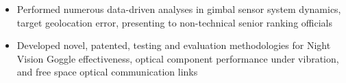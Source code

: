 \begin{itemize} [leftmargin = \itemmargin]
	\item Performed numerous data-driven analyses in gimbal sensor system dynamics, target geolocation error, presenting to non-technical senior ranking officials
	\item Developed novel, patented, testing and evaluation methodologies for Night Vision Goggle effectiveness, optical component performance under vibration, and free space optical communication links
\end{itemize} 
